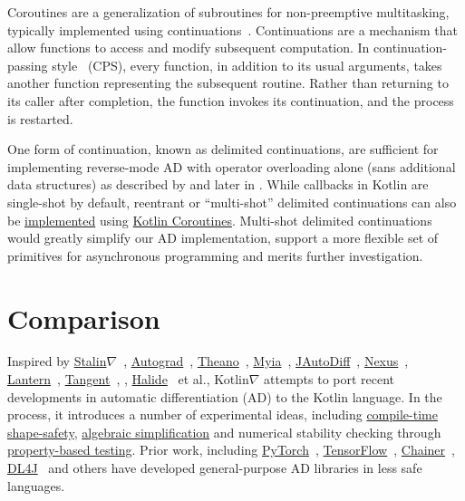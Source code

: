 Coroutines are a generalization of subroutines for non-preemptive multitasking, typically implemented using continuations~\citep{haynes1984continuations}. Continuations are a mechanism that allow functions to access and modify subsequent computation. In continuation-passing style~\citep{sussman1975scheme} (CPS), every function, in addition to its usual arguments, takes another function representing the subsequent routine. Rather than returning to its caller after completion, the function invokes its continuation, and the process is restarted.

One form of continuation, known as delimited continuations, are sufficient for implementing reverse-mode AD with operator overloading alone (sans additional data structures) as described by \citet{wang2018demystifying} and later in \citet{wang2018backpropagation}. While callbacks in Kotlin are single-shot by default, reentrant or ``multi-shot'' delimited continuations can also be \href{https://gist.github.com/elizarov/ddee47f927dda500dc493e945128d661}{implemented} using \href{https://kotlinlang.org/docs/reference/coroutines-overview.html}{Kotlin Coroutines}. Multi-shot delimited continuations would greatly simplify our AD implementation, support a more flexible set of primitives for asynchronous programming and merits further investigation.

\section{Comparison}\label{sec:comparison}

Inspired by \href{https://github.com/Functional-AutoDiff/STALINGRAD}{Stalin$\nabla$}~\citep{pearlmutter2008using}, \href{https://github.com/HIPS/autograd/}{Autograd}~\citep{maclaurin2015autograd, maclaurin2016phd}, \href{http://deeplearning.net/software/theano/}{Theano}~\citep{bergstra2010theano}, \href{https://github.com/mila-iqia/myia}{Myia}~\citep{breuleux2017automatic, vanmerrienboer2018ad}, \href{https://github.com/uniker9/JAutoDiff/}{JAutoDiff}~\citep{nureki2012jautodiff}, \href{https://tongfei.me/nexus/}{Nexus}~\citep{chen2017typesafe}, \href{https://feiwang3311.github.io/Lantern/}{Lantern}~\citep{wang2018demystifying}, \href{https://github.com/google/tangent}{Tangent}~\citep{van2018tangent}, \citet{elliott2018simple}, \href{https://people.csail.mit.edu/tzumao/gradient_halide/}{Halide}~\citep{li2018halide} et al., Kotlin$\nabla$ attempts to port recent developments in automatic differentiation (AD) to the Kotlin language. In the process, it introduces a number of experimental ideas, including \hyperref[sec:shape-safety]{compile-time shape-safety}, \hyperref[sec:multiple-dispatch]{algebraic simplification} and numerical stability checking through \hyperref[sec:testing]{property-based testing}. Prior work, including \href{https://pytorch.org/}{PyTorch}~\citep{paszke2019pytorch}, \href{https://www.tensorflow.org/}{TensorFlow}~\citep{abadi2016tensorflow}, \href{https://chainer.org/}{Chainer}~\citep{chainer}, \href{https://deeplearning4j.org/}{DL4J}~\cite{team2016dl4j} and others have developed general-purpose AD libraries in less safe languages.

